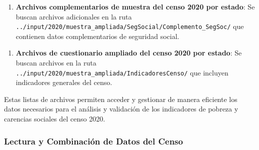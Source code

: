 \documentclass[
  12pt,
]{book}
\newenvironment{Shaded}{\begin{snugshade}}{\end{snugshade}}
\newcommand{\AttributeTok}[1]{\textcolor[rgb]{0.13,0.29,0.53}{#1}}
\newcommand{\ConstantTok}[1]{\textcolor[rgb]{0.56,0.35,0.01}{#1}}
\newcommand{\FunctionTok}[1]{\textcolor[rgb]{0.13,0.29,0.53}{\textbf{#1}}}
\newcommand{\NormalTok}[1]{#1}
\newcommand{\OtherTok}[1]{\textcolor[rgb]{0.56,0.35,0.01}{#1}}
\newcommand{\StringTok}[1]{\textcolor[rgb]{0.31,0.60,0.02}{#1}}
\providecommand{\tightlist}{%
  \setlength{\itemsep}{0pt}\setlength{\parskip}{0pt}}
\begin{document}
\begin{enumerate}
\def\labelenumi{\arabic{enumi}.}
\setcounter{enumi}{1}
\tightlist
\item
  \textbf{Archivos complementarios de muestra del censo 2020 por estado}: Se buscan archivos adicionales en la ruta
  \texttt{../input/2020/muestra\_ampliada/SegSocial/Complemento\_SegSoc/} que contienen datos complementarios de seguridad social.
\end{enumerate}

\begin{Shaded}
\end{Shaded}

\begin{enumerate}
\def\labelenumi{\arabic{enumi}.}
\setcounter{enumi}{2}
\tightlist
\item
  \textbf{Archivos de cuestionario ampliado del censo 2020 por estado}: Se buscan archivos en la ruta \texttt{../input/2020/muestra\_ampliada/IndicadoresCenso/} que incluyen indicadores generales del censo.
\end{enumerate}

\begin{Shaded}
\end{Shaded}

Estas listas de archivos permiten acceder y gestionar de manera eficiente los datos necesarios para el análisis y validación de los indicadores de pobreza y carencias sociales del censo 2020.

\hypertarget{lectura-y-combinaciuxf3n-de-datos-del-censo}{%
\subsubsection*{Lectura y Combinación de Datos del Censo}\label{lectura-y-combinaciuxf3n-de-datos-del-censo}}
\end{document}
